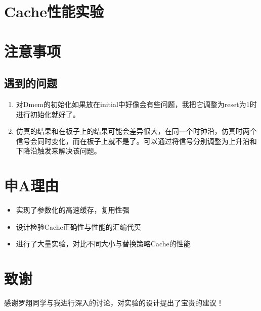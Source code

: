 \documentclass[12pt]{article} %
\begin{document}
\begin{sloppypar}
\newpage
\section{Cache性能实验}


\newpage
\section{注意事项}

\subsection{遇到的问题}

\begin{enumerate}
\item 对Dmem的初始化如果放在initial中好像会有些问题，我把它调整为reset为1时进行初始化就好了。
\item 仿真的结果和在板子上的结果可能会差异很大，在同一个时钟沿，仿真时两个信号会同时变化，而在板子上就不是了。可以通过将信号分别调整为上升沿和下降沿触发来解决该问题。
\end{enumerate}

\section{申A理由}

\begin{itemize}
\item 实现了参数化的高速缓存，复用性强
\item 设计检验Cache正确性与性能的汇编代买
\item 进行了大量实验，对比不同大小与替换策略Cache的性能
\end{itemize}

\section{致谢}

感谢罗翔同学与我进行深入的讨论，对实验的设计提出了宝贵的建议！

\end{sloppypar}
\end{document}
